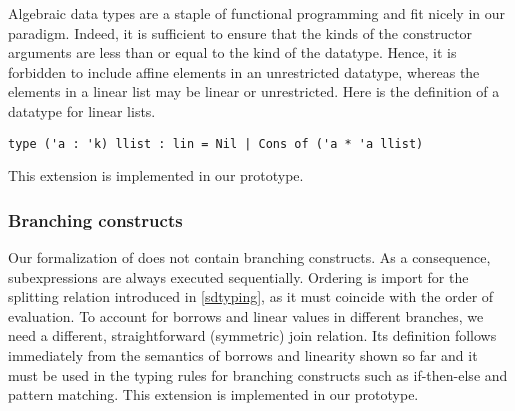 Algebraic data types are a staple of functional programming and fit nicely
in our paradigm. Indeed, it is sufficient to ensure  that the kinds of
the constructor arguments are less than or equal to the kind of the datatype.
Hence, it is forbidden to include affine elements in an unrestricted
datatype, whereas the elements in a linear list may be linear or
unrestricted. 
Here is the definition of a datatype for linear lists.

\begin{lstlisting}
type ('a : 'k) llist : lin = Nil | Cons of ('a * 'a llist)
\end{lstlisting}

This extension is implemented in our prototype.

\subsubsection{Branching constructs}

Our formalization of \lang does not contain branching constructs. As a consequence,
subexpressions are always executed sequentially. Ordering is import
for the splitting relation introduced in \cref{sdtyping}, as it must
coincide with the order of evaluation. To account for borrows and linear
values in different branches, we need a different, straightforward (symmetric) join relation.
Its definition follows immediately from the semantics of borrows and linearity
shown so far and it must be used in the typing rules for branching
constructs such as if-then-else and pattern matching.
This extension is implemented in our prototype.

\lstDeleteShortInline@

